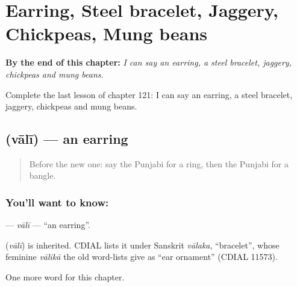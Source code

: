
\chapter{Earring, Steel bracelet, Jaggery, Chickpeas, Mung beans}
\label{ch:pa-earring-steel-bracelet-jaggery-chickpeas-mung-beans}

\begin{chapteropening}
\textbf{By the end of this chapter:} \emph{I can say an earring, a steel bracelet, jaggery, chickpeas and mung beans.}

Complete the last lesson of chapter 121: I can say an earring, a steel bracelet, jaggery, chickpeas and mung beans.
\end{chapteropening}

\section[\texorpdfstring{\pa{ਵਾਲੀ} (vālī)}{ਵਾਲੀ (vālī)}]{ (vālī) — an earring}

\label{lesson:PA-C121-vali}



\begin{quote}
Before the new one: say the Punjabi for a ring, then the Punjabi for a bangle.
\end{quote}

\subsection*{You'll want to know: }
\textbf{} — \emph{vālī} — \textquotedblleft{}an earring\textquotedblright{}.

\begin{cousinweb}
\textbf{} (\emph{vālī}) is inherited. CDIAL lists it under Sanskrit \emph{vālaka}, \textquotedblleft{}bracelet\textquotedblright{}, whose feminine \emph{vālikā} the old word-lists give as \textquotedblleft{}ear ornament\textquotedblright{} (CDIAL 11573).
\end{cousinweb}

\begin{grammarlens}[title={What you've built}]
One more word for this chapter.
\end{grammarlens}


